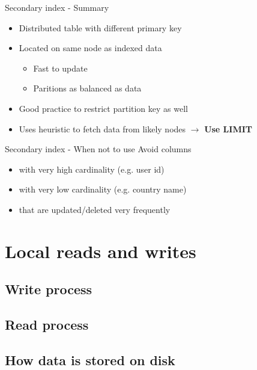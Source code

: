 \documentclass[
  10pt
]{beamer}
\begin{document}
\begin{frame}{Secondary index - Summary}
  \begin{itemize}
    \item<1-> Distributed table with different primary key
    \item<2-> Located on same node as indexed data
      \begin{itemize}
        \item Fast to update
        \item Paritions as balanced as data
      \end{itemize}
    \item<3-> Good practice to restrict partition key as well
    \item<4-> Uses heuristic to fetch data from likely nodes $\rightarrow$ \textbf{Use LIMIT}
  \end{itemize}
\end{frame}

\begin{frame}{Secondary index - When not to use}
  Avoid columns
  \begin{itemize}
    \item<1-> with very high cardinality (e.g. user id)
    \item<2-> with very low cardinality (e.g. country name)
    \item<3-> that are updated/deleted very frequently
  \end{itemize}
\end{frame}

\section{Local reads and writes}  %
\subsection{Write process}
\subsection{Read process}
\subsection{How data is stored on disk}
\end{document}
